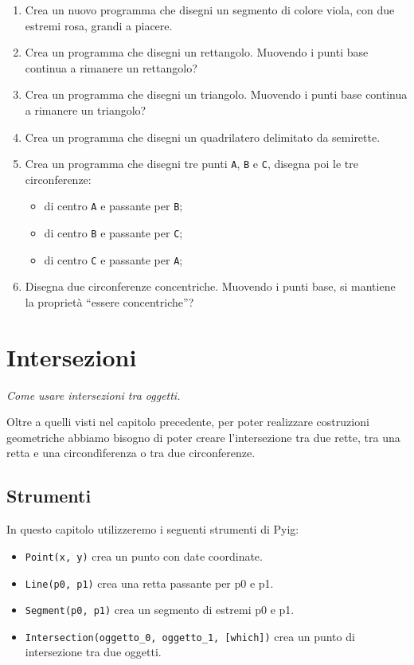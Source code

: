 \begin{enumerate} [noitemsep]
\item Crea un nuovo programma che disegni un segmento di colore viola,
con due estremi rosa, grandi a piacere.
\item Crea un programma che disegni un rettangolo. Muovendo i punti base
continua a rimanere un rettangolo?
\item Crea un programma che disegni un triangolo. Muovendo i punti base
continua a rimanere un triangolo?
\item Crea un programma che disegni un quadrilatero delimitato da semirette.
\item Crea un programma che disegni tre punti \texttt{A}, \texttt{B} e 
\texttt{C}, disegna poi le tre circonferenze:

\begin{itemize} [noitemsep]
\item di centro \texttt{A} e passante per \texttt{B};
\item di centro \texttt{B} e passante per \texttt{C};
\item di centro \texttt{C} e passante per \texttt{A};
\end{itemize}

\item Disegna due circonferenze concentriche. Muovendo i punti base, si 
mantiene la proprietà ``essere concentriche''?
\end{enumerate}


\section{Intersezioni}
\label{sec:intersezioni}

\emph{Come usare intersezioni tra oggetti.}

Oltre a quelli visti nel capitolo precedente, per poter realizzare costruzioni
geometriche abbiamo bisogno di poter creare l'intersezione tra due rette,
tra una retta e una circondìferenza o tra due circonferenze.


\subsection{Strumenti}

In questo capitolo utilizzeremo i seguenti strumenti di Pyig:

\begin{itemize} [noitemsep]
\item \texttt{Point(x, y)} crea un punto con date coordinate.
\item \texttt{Line(p0, p1)} crea una retta passante per p0 e p1.
\item \texttt{Segment(p0, p1)} crea un segmento di estremi p0 e p1.
\item \texttt{Intersection(oggetto\_0, oggetto\_1, {[}which{]})} crea un punto 
di intersezione tra due oggetti.
\end{itemize}


